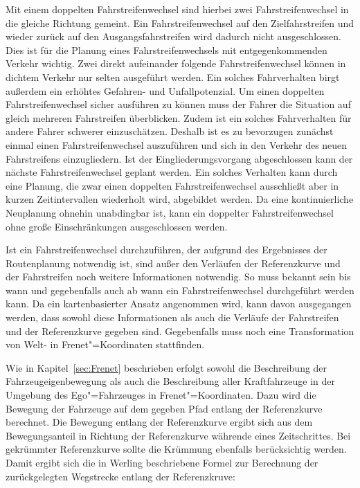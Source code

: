 Mit einem doppelten Fahrstreifenwechsel sind hierbei zwei Fahrstreifenwechsel in die gleiche Richtung gemeint.
Ein Fahrstreifenwechsel auf den Zielfahrstreifen und wieder zur\"uck auf den Ausgangsfahrstreifen wird dadurch nicht ausgeschlossen.
Dies ist f\"ur die Planung eines Fahrstreifenwechsels mit entgegenkommenden Verkehr wichtig.
Zwei direkt aufeinander folgende Fahrstreifenwechsel k\"onnen in dichtem Verkehr nur selten ausgef\"uhrt werden.
Ein solches Fahrverhalten birgt au{\ss}erdem ein erh\"ohtes Gefahren- und Unfallpotenzial.
Um einen doppelten Fahrstreifenwechsel sicher ausf\"uhren zu k\"onnen muss der Fahrer die Situation auf gleich mehreren Fahrstreifen \"uberblicken.
Zudem ist ein solches Fahrverhalten f\"ur andere Fahrer schwerer einzusch\"atzen.
Deshalb ist es zu bevorzugen zun\"achst einmal einen Fahrstreifenwechsel auszuf\"uhren und sich in den Verkehr des neuen Fahrstreifens einzugliedern.
Ist der Eingliederungsvorgang abgeschlossen kann der n\"achste Fahrstreifenwechsel geplant werden.
Ein solches Verhalten kann durch eine Planung, die zwar einen doppelten Fahrstreifenwechsel ausschlie{\ss}t aber in kurzen Zeitintervallen wiederholt wird, abgebildet werden.
Da eine kontinuierliche Neuplanung ohnehin unabdingbar ist, kann ein doppelter Fahrstreifenwechsel ohne gro{\ss}e Einschr\"ankungen ausgeschlossen werden.

Ist ein Fahrstreifenwechsel durchzuf\"uhren, der aufgrund des Ergebnisses der Routenplanung notwendig ist, sind au{\ss}er den Verl\"aufen der Referenzkurve und der Fahrstreifen noch weitere Informationen notwendig.
So muss bekannt sein bis wann und gegebenfalls auch ab wann ein Fahrstreifenwechsel durchgef\"uhrt werden kann.
Da ein kartenbasierter Ansatz angenommen wird, kann davon ausgegangen werden, dass sowohl diese Informationen als auch die Verl\"aufe der Fahrstreifen und der Referenzkurve gegeben sind.
Gegebenfalls muss noch eine Transformation von Welt- in Frenet"=Koordinaten stattfinden.

Wie in Kapitel~\ref{sec:Frenet} beschrieben erfolgt sowohl die Beschreibung der Fahrzeugeigenbewegung als auch die Beschreibung aller Kraftfahrzeuge in der Umgebung des Ego"=Fahrzeuges in Frenet"=Koordinaten.
Dazu wird die Bewegung der Fahrzeuge auf dem gegeben Pfad entlang der Referenzkurve berechnet.
Die Bewegung entlang der Referenzkurve ergibt sich aus dem Bewegungsanteil in Richtung der Referenzkurve w\"ahrende eines Zeitschrittes.
Bei gekr\"ummter Referenzkurve sollte die Kr\"ummung ebenfalls ber\"ucksichtig werden.
Damit ergibt sich die in Werling \cite{Werling2011} beschriebene Formel zur Berechnung der zur\"uckgelegten Wegstrecke entlang der Referenzkruve:

